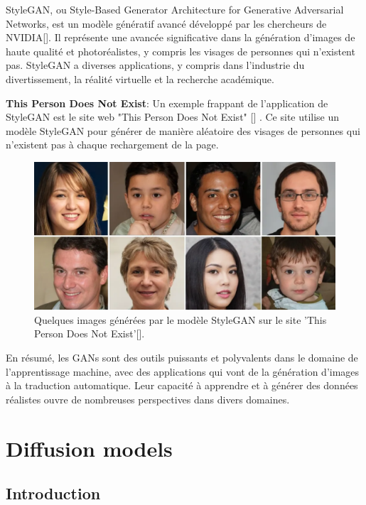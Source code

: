 StyleGAN, ou Style-Based Generator Architecture for Generative Adversarial
Networks, est un modèle génératif avancé développé par les chercheurs de
NVIDIA[\cite{karras2019style}]. Il représente une avancée significative dans la
génération d'images de haute qualité et photoréalistes, y compris les visages
de personnes qui n'existent pas. StyleGAN a diverses applications, y compris
dans l'industrie du divertissement, la réalité virtuelle et la recherche
académique.

\textbf{This Person Does Not Exist}: Un exemple frappant de l'application de StyleGAN est le site web "This Person Does Not Exist" [\cite{thispersondoesnotexist}]  . Ce site utilise un modèle StyleGAN pour générer de manière aléatoire des visages de personnes qui n'existent pas à chaque rechargement de la page.

\begin{figure}[hbt!]
	\centering
	\includegraphics[width=12cm]{images_pfe/thisperson.png}
	\caption{Quelques images générées par le modèle StyleGAN sur le site 'This Person Does Not Exist'[\cite{thispersondoesnotexist}].}
	\label{fig:thisperson}
\end{figure}
\FloatBarrier

En résumé, les GANs sont des outils puissants et polyvalents dans le domaine de
l'apprentissage machine, avec des applications qui vont de la génération
d'images à la traduction automatique. Leur capacité à apprendre et à générer
des données réalistes ouvre de nombreuses perspectives dans divers domaines.

\section{Diffusion models}
\subsection{Introduction}


